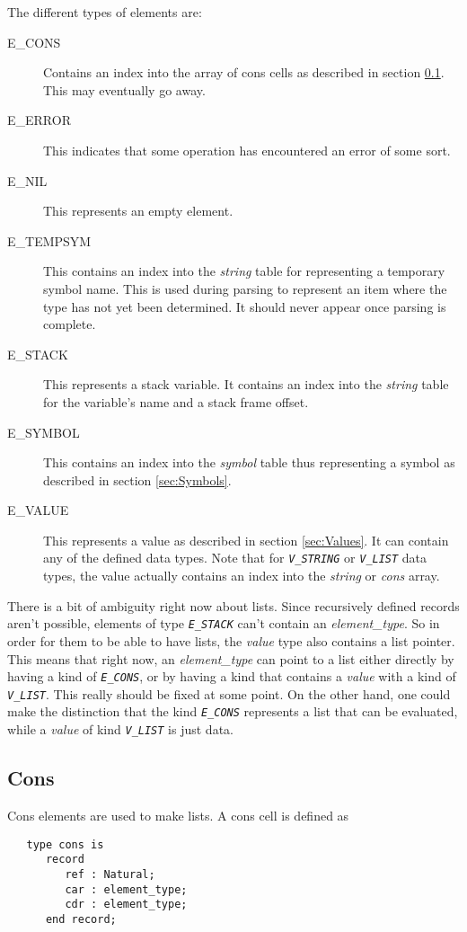\documentclass[10pt, openany]{book}
\newcommand{\constant}[1]{\emph{\texttt{#1}}}
\begin{document}
The different types of elements are:
\begin{description}
  \item[E\_CONS] Contains an index into the array of cons cells as described in section \ref{sec:Cons}.  This may eventually go away.
  \item[E\_ERROR]  This indicates that some operation has encountered an error of some sort.
  \item[E\_NIL] This represents an empty element.
  \item[E\_TEMPSYM] This contains an index into the \emph{string} table for representing a temporary symbol name.  This is used during parsing to represent an item where the type has not yet been determined.  It should never appear once parsing is complete.
  \item[E\_STACK] This represents a stack variable.  It contains an index into the \emph{string} table for the variable's name and a stack frame offset.
  \item[E\_SYMBOL] This contains an index into the \emph{symbol} table thus representing a symbol as described in section \ref{sec:Symbols}.
  \item[E\_VALUE] This represents a value as described in section \ref{sec:Values}.  It can contain any of the defined data types.  Note that for \constant{V\_STRING} or \constant{V\_LIST} data types, the value actually contains an index into the \emph{string} or \emph{cons} array.
\end{description}

There is a bit of ambiguity right now about lists.  Since recursively defined records aren't possible, elements of type  \constant{E\_STACK} can't contain an \emph{element\_type}.  So in order for them to be able to have lists, the \emph{value} type also contains a list pointer.  This means that right now, an \emph{element\_type} can point to a list either directly by having a kind of \constant{E\_CONS}, or by having a kind that contains a \emph{value} with a kind of \constant{V\_LIST}.  This really should be fixed at some point.  On the other hand, one could make the distinction that the kind \constant{E\_CONS} represents a list that can be evaluated, while a \emph{value} of kind \constant{V\_LIST} is just data.

\subsection{Cons}
\label{sec:Cons}
Cons elements are used to make lists.  A cons cell is defined as
\begin{lstlisting}
   type cons is
      record
         ref : Natural;
         car : element_type;
         cdr : element_type;
      end record;
\end{lstlisting}
\end{document}
